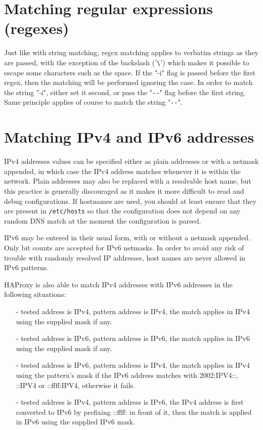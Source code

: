 \section{Matching regular expressions (regexes)}
\label{sec:matching_regular_expressions}

Just like with string matching, regex matching applies to verbatim strings as
they are passed, with the exception of the backslash ('\verb|\|') which makes it
possible to escape some characters such as the space. If the "-i" flag is
passed before the first regex, then the matching will be performed ignoring
the case. In order to match the string "-i", either set it second, or pass
the "\verb|--|" flag before the first string. Same principle applies of course to
match the string "\verb|--|".

\section{Matching IPv4 and IPv6 addresses}
\label{sec:matching_ip_address}

IPv4 addresses values can be specified either as plain addresses or with a
netmask appended, in which case the IPv4 address matches whenever it is
within the network. Plain addresses may also be replaced with a resolvable
host name, but this practice is generally discouraged as it makes it more
difficult to read and debug configurations. If hostnames are used, you should
at least ensure that they are present in \texttt{/etc/hosts} so that the configuration
does not depend on any random DNS match at the moment the configuration is
parsed.

IPv6 may be entered in their usual form, with or without a netmask appended.
Only bit counts are accepted for IPv6 netmasks. In order to avoid any risk of
trouble with randomly resolved IP addresses, host names are never allowed in
IPv6 patterns.

HAProxy is also able to match IPv4 addresses with IPv6 addresses in the
following situations:
\begin{itemize}
\item[-] tested address is IPv4, pattern address is IPv4, the match applies
    in IPv4 using the supplied mask if any.
\item[-] tested address is IPv6, pattern address is IPv6, the match applies
    in IPv6 using the supplied mask if any.
\item[-] tested address is IPv6, pattern address is IPv4, the match applies in IPv4
    using the pattern's mask if the IPv6 address matches with 2002:IPV4::,
    ::IPV4 or ::ffff:IPV4, otherwise it fails.
\item[-] tested address is IPv4, pattern address is IPv6, the IPv4 address is first
    converted to IPv6 by prefixing ::ffff: in front of it, then the match is
    applied in IPv6 using the supplied IPv6 mask.
\end{itemize}

